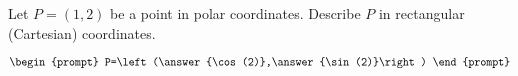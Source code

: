 \documentclass{ximera}
\author{Gregory Hartman \and Matthew Carr}
\begin{document}
\begin{exercise}





Let $P=(1,2)$ be a point in polar coordinates. Describe $P$ in rectangular (Cartesian) coordinates.

\[
\begin{prompt}
P=\left(\answer{\cos(2)},\answer{\sin(2)}\right)
\end{prompt}
\]

\end{exercise}
\end{document}
